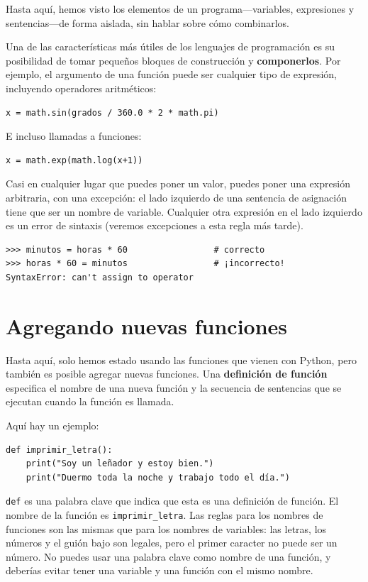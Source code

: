 \documentclass[10pt]{book}
\begin{document}
Hasta aquí, hemos visto los elementos de un programa---variables,
expresiones y sentencias---de forma aislada, sin hablar sobre cómo
combinarlos.

Una de las características más útiles de los lenguajes de programación es su
posibilidad de tomar pequeños bloques de construcción y {\bf componerlos}.  Por
ejemplo, el argumento de una función puede ser cualquier tipo de expresión,
incluyendo operadores aritméticos:

\begin{verbatim}
x = math.sin(grados / 360.0 * 2 * math.pi)
\end{verbatim}
%
E incluso llamadas a funciones:

\begin{verbatim}
x = math.exp(math.log(x+1))
\end{verbatim}
%
Casi en cualquier lugar que puedes poner un valor, puedes poner una expresión
arbitraria, con una excepción: el lado izquierdo de una sentencia
de asignación tiene que ser un nombre de variable. Cualquier otra expresión en el lado
izquierdo es un error de sintaxis (veremos excepciones a esta regla
más tarde).

\begin{verbatim}
>>> minutos = horas * 60                 # correcto
>>> horas * 60 = minutos                 # ¡incorrecto!
SyntaxError: can't assign to operator
\end{verbatim}
%


\section{Agregando nuevas funciones}

Hasta aquí, solo hemos estado usando las funciones que vienen con Python,
pero también es posible agregar nuevas funciones.
Una {\bf definición de función} especifica el nombre de una nueva función y
la secuencia de sentencias que se ejecutan cuando la función es llamada.

Aquí hay un ejemplo:

\begin{verbatim}
def imprimir_letra():
    print("Soy un leñador y estoy bien.")
    print("Duermo toda la noche y trabajo todo el día.")
\end{verbatim}
%
{\tt def} es una palabra clave que indica que esta es una definición
de función. El nombre de la función es \verb"imprimir_letra".  Las
reglas para los nombres de funciones son las mismas que para los nombres de variables: las letras,
los números y el guión bajo son legales, pero el primer caracter
no puede ser un número.  No puedes usar una palabra clave como nombre de una función,
y deberías evitar tener una variable y una función con el mismo
nombre.
\end{document}
